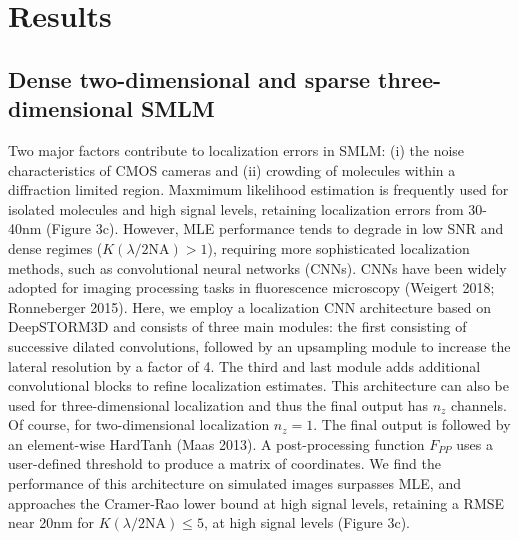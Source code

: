 \documentclass{ucetd}
\begin{document}
\section{Results}

\subsection{Dense two-dimensional and sparse three-dimensional SMLM}

Two major factors contribute to localization errors in SMLM: (i) the noise characteristics of CMOS cameras and (ii) crowding of molecules within a diffraction limited region. Maxmimum likelihood estimation is frequently used for isolated molecules and high signal levels, retaining localization errors from 30-40nm (Figure 3c). However, MLE performance tends to degrade in low SNR and dense regimes ($K(\lambda/2\mathrm{NA}) > 1$), requiring more sophisticated localization methods, such as convolutional neural networks (CNNs). CNNs have been widely adopted for imaging processing tasks in fluorescence microscopy (Weigert 2018; Ronneberger 2015). Here, we employ a localization CNN architecture based on DeepSTORM3D and consists of three main modules: the first consisting of successive dilated convolutions, followed by an upsampling module to increase the lateral resolution by a factor of 4. The third and last module adds additional convolutional blocks to refine localization estimates. This architecture can also be used for three-dimensional localization and thus the final output has $n_{z}$ channels. Of course, for two-dimensional localization $n_{z}=1$. The final output is followed by an element-wise HardTanh (Maas 2013). A post-processing function $F_{PP}$ uses a user-defined threshold to produce a matrix of coordinates. We find the performance of this architecture on simulated images surpasses MLE, and approaches the Cramer-Rao lower bound at high signal levels, retaining a RMSE near 20nm for $K(\lambda/2\mathrm{NA}) \leq 5$, at high signal levels (Figure 3c). 
\end{document}
